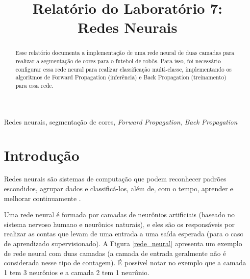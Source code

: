 \documentclass[conference]{IEEEtran}
\begin{document}
\title{Relatório do Laboratório 7: \\ Redes Neurais\\
}

\author{
}

\maketitle

\begin{abstract}
Esse relatório documenta a implementação de uma rede neural de duas camadas para realizar a segmentação de cores para o futebol de robôs. Para isso, foi necessário configurar essa rede neural para realizar classificação multi-classe, implementando os algoritmos de Forward Propagation (inferência) e Back Propagation (treinamento) para essa rede.
\end{abstract}

\begin{IEEEkeywords}
Redes neurais, segmentação de cores, \textit{Forward Propagation}, \textit{Back Propagation}
\end{IEEEkeywords}

\section{Introdução}
Redes neurais são sistemas de computação que podem reconhecer padrões escondidos, agrupar dados e classificá-los, além de, com o tempo, aprender e melhorar continuamente \cite{sas}.

Uma rede neural é formada por camadas de neurônios artificiais (baseado no sistema nervoso humano e neurônios naturais), e eles são os responsáveis por realizar as contas que levam de uma entrada a uma saída esperada (para o caso de aprendizado supervisionado). A Figura \ref{rede_neural} apresenta um exemplo de rede neural com duas camadas (a camada de entrada geralmente não é considerada nesse tipo de contagem). É possível notar no exemplo que a camada 1 tem 3 neurônios e a camada 2 tem 1 neurônio. 
\end{document}
